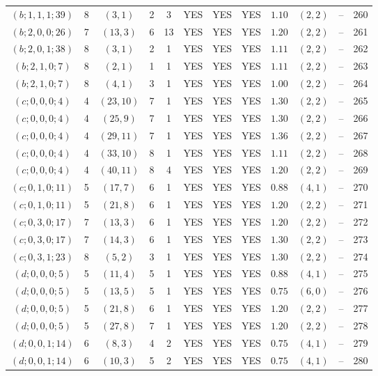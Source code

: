 \begin{longtable}{|c|c|c|c|c|c|c|c|c|c|c|c|}
$(b;1,1,1;39)$ & 8 & $(3,1)$ & 2 & 3 & YES & YES & YES & $1.10$ & $(2,2)$ & -- & 260\\
$(b;2,0,0;26)$ & 7 & $(13,3)$ & 6 & 13 & YES & YES & YES & $1.20$ & $(2,2)$ & -- & 261\\
$(b;2,0,1;38)$ & 8 & $(3,1)$ & 2 & 1 & YES & YES & YES & $1.11$ & $(2,2)$ & -- & 262\\
$(b;2,1,0;7)$ & 8 & $(2,1)$ & 1 & 1 & YES & YES & YES & $1.11$ & $(2,2)$ & -- & 263\\
$(b;2,1,0;7)$ & 8 & $(4,1)$ & 3 & 1 & YES & YES & YES & $1.00$ & $(2,2)$ & -- & 264\\
$(c;0,0,0;4)$ & 4 & $(23,10)$ & 7 & 1 & YES & YES & YES & $1.30$ & $(2,2)$ & -- & 265\\
$(c;0,0,0;4)$ & 4 & $(25,9)$ & 7 & 1 & YES & YES & YES & $1.30$ & $(2,2)$ & -- & 266\\
$(c;0,0,0;4)$ & 4 & $(29,11)$ & 7 & 1 & YES & YES & YES & $1.36$ & $(2,2)$ & -- & 267\\
$(c;0,0,0;4)$ & 4 & $(33,10)$ & 8 & 1 & YES & YES & YES & $1.11$ & $(2,2)$ & -- & 268\\
$(c;0,0,0;4)$ & 4 & $(40,11)$ & 8 & 4 & YES & YES & YES & $1.20$ & $(2,2)$ & -- & 269\\
$(c;0,1,0;11)$ & 5 & $(17,7)$ & 6 & 1 & YES & YES & YES & $0.88$ & $(4,1)$ & -- & 270\\
$(c;0,1,0;11)$ & 5 & $(21,8)$ & 6 & 1 & YES & YES & YES & $1.20$ & $(2,2)$ & -- & 271\\
$(c;0,3,0;17)$ & 7 & $(13,3)$ & 6 & 1 & YES & YES & YES & $1.20$ & $(2,2)$ & -- & 272\\
$(c;0,3,0;17)$ & 7 & $(14,3)$ & 6 & 1 & YES & YES & YES & $1.30$ & $(2,2)$ & -- & 273\\
$(c;0,3,1;23)$ & 8 & $(5,2)$ & 3 & 1 & YES & YES & YES & $1.30$ & $(2,2)$ & -- & 274\\
$(d;0,0,0;5)$ & 5 & $(11,4)$ & 5 & 1 & YES & YES & YES & $0.88$ & $(4,1)$ & -- & 275\\
$(d;0,0,0;5)$ & 5 & $(13,5)$ & 5 & 1 & YES & YES & YES & $0.75$ & $(6,0)$ & -- & 276\\
$(d;0,0,0;5)$ & 5 & $(21,8)$ & 6 & 1 & YES & YES & YES & $1.20$ & $(2,2)$ & -- & 277\\
$(d;0,0,0;5)$ & 5 & $(27,8)$ & 7 & 1 & YES & YES & YES & $1.20$ & $(2,2)$ & -- & 278\\
$(d;0,0,1;14)$ & 6 & $(8,3)$ & 4 & 2 & YES & YES & YES & $0.75$ & $(4,1)$ & -- & 279\\
$(d;0,0,1;14)$ & 6 & $(10,3)$ & 5 & 2 & YES & YES & YES & $0.75$ & $(4,1)$ & -- & 280\\

\end{longtable}
